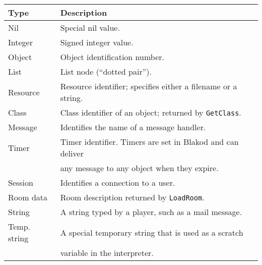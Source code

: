 \documentclass[12pt]{article}
\begin{document}
\begin{center}
\begin{tabular}{||l|l||} \hline
Type & Description 
\\ \hline \hline
Nil      &  Special nil value.
\\ \hline
Integer  &  Signed integer value.
\\ \hline
Object   &  Object identification number.
\\ \hline
List     &  List node (``dotted pair'').
\\ \hline
Resource &  Resource identifier; specifies either a filename or a
string.
\\ \hline
Class    &  Class identifier of an object; returned by {\tt GetClass}.
\\ \hline
Message  &  Identifies the name of a message handler.
\\ \hline
Timer    &  Timer identifier.  Timers are set in Blakod and can deliver \\
         &  any message to any object when they expire.
\\ \hline
Session  &  Identifies a connection to a user.
\\ \hline
Room data&  Room description returned by {\tt LoadRoom}.
\\ \hline
String   &  A string typed by a player, such as a mail message. 
\\ \hline
Temp. string & A special temporary string that is used as a scratch \\
             & variable in the interpreter.  
\\ \hline
\end{tabular}
\end{center}
\end{document}
